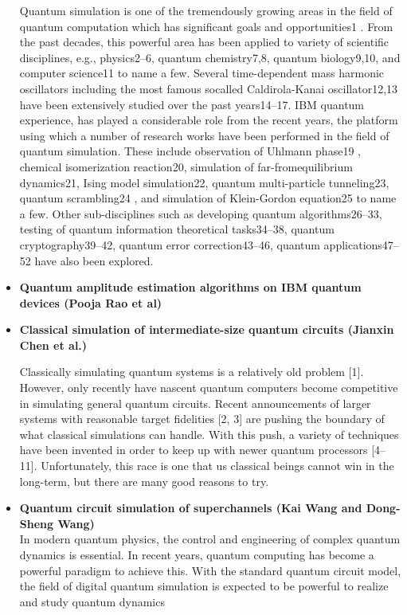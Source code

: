 \documentclass[10pt,letterpaper]{article} %
\begin{document}
\begin{itemize}
Quantum simulation is one of the tremendously growing areas in the field of quantum computation which
has significant goals and opportunities1
. From the
past decades, this powerful area has been applied to
variety of scientific disciplines, e.g., physics2–6, quantum chemistry7,8, quantum biology9,10, and computer
science11 to name a few. Several time-dependent mass
harmonic oscillators including the most famous socalled Caldirola-Kanai oscillator12,13 have been extensively studied over the past years14–17. IBM quantum
experience, has played a considerable role from the recent years, the platform using which a number of research
works have been performed in the field of quantum simulation. These include observation of Uhlmann phase19
,
chemical isomerization reaction20, simulation of far-fromequilibrium dynamics21, Ising model simulation22, quantum multi-particle tunneling23, quantum scrambling24
,
and simulation of Klein-Gordon equation25 to name a
few. Other sub-disciplines such as developing quantum
algorithms26–33, testing of quantum information theoretical tasks34–38, quantum cryptography39–42, quantum error correction43–46, quantum applications47–52 have also
been explored.


\item  \textbf{Quantum amplitude estimation algorithms on IBM quantum
devices (Pooja Rao et al)}

\item  \textbf{Classical simulation of intermediate-size quantum circuits (Jianxin Chen et al.)}


Classically simulating quantum systems is a relatively old problem [1]. However, only recently have nascent
quantum computers become competitive in simulating general quantum circuits. Recent announcements of larger
systems with reasonable target fidelities [2, 3] are pushing the boundary of what classical simulations can handle.
With this push, a variety of techniques have been invented in order to keep up with newer quantum processors
[4–11]. Unfortunately, this race is one that us classical beings cannot win in the long-term, but there are many good
reasons to try. \\

\item \textbf{Quantum circuit simulation of superchannels (Kai Wang and Dong-Sheng Wang)} \\

In modern quantum physics, the control and engineering of complex quantum dynamics is essential. In
recent years, quantum computing has become a powerful paradigm to achieve this. With the standard
quantum circuit model, the field of digital quantum simulation is expected to be powerful to realize and
study quantum dynamics






\end{itemize}
\end{document}
